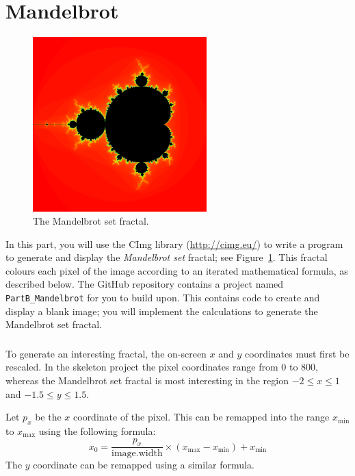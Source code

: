 \part{Mandelbrot}

\begin{figure}
    \begin{center}
        \includegraphics[width=0.6\textwidth]{mandelbrot.png}
    \end{center}
    \caption{The Mandelbrot set fractal.}
    \label{fig:mandelbrot}
\end{figure}

In this part, you will use the CImg library (\url{http://cimg.eu/}) to write a program to generate and display the \emph{Mandelbrot set} fractal; see Figure~\ref{fig:mandelbrot}.
This fractal colours each pixel of the image according to an iterated mathematical formula, as described below.
The GitHub repository contains a project named \texttt{PartB\_Mandelbrot} for you to build upon.
This contains code to create and display a blank image; you will implement the calculations to generate the Mandelbrot set fractal.

\section{} \label{core-c-first}

To generate an interesting fractal, the on-screen $x$ and $y$ coordinates must first be rescaled.
In the skeleton project the pixel coordinates range from $0$ to $800$,
whereas the Mandelbrot set fractal is most interesting in the region $-2 \leq x \leq 1$ and $-1.5 \leq y \leq 1.5$.

Let $p_x$ be the $x$ coordinate of the pixel. This can be remapped into the range $x_{\text{min}}$ to $x_{\text{max}}$ using the following formula:
\begin{equation*}
    x_0 = \frac{p_x}{\text{image.width}} \times \left( x_{\text{max}} - x_{\text{min}} \right) + x_{\text{min}}
\end{equation*}
The $y$ coordinate can be remapped using a similar formula.

